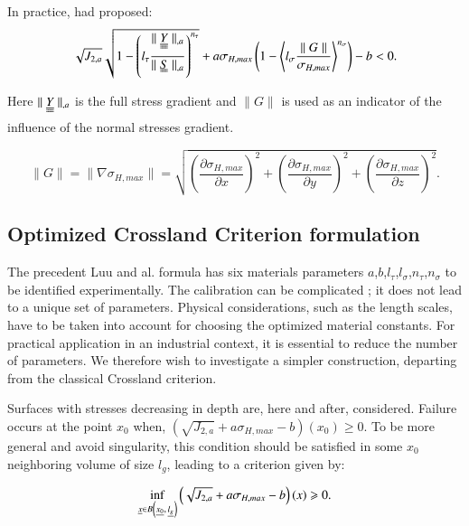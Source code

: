 \documentclass[3p,times,procedia,number]{elsarticle}
\begin{document}
In practice, \cite{luu2013formulation} had proposed:
\begin{equation}
\sqrt{{J_{2,a}}}\sqrt{1-\left(l_\tau\dfrac{\parallel \uuline{\uline{Y}}\parallel_{,a}}{\parallel \uuline{S}\parallel_{,a}}\right)^{n_\tau}}+a\sigma_{H,max}\left(1-\left\langle  l_\sigma\dfrac{\parallel G\parallel}{\sigma_{H,max}}\right\rangle ^{n_\sigma}\right)-b < 0 .
\end{equation}

Here $\parallel \uuline{\uline{Y}}\parallel_{,a}$ is the full stress gradient and $\parallel G\parallel$ is used as an indicator of the influence of the normal stresses gradient.

\begin{equation}
\parallel{G}\parallel=\parallel{\nabla \sigma_{H,max}}\parallel=\sqrt{\left(\dfrac{\partial \sigma_{H,max}}{\partial x}\right)^2+\left(\dfrac{\partial \sigma_{H,max}}{\partial y}\right)^2+\left(\dfrac{\partial \sigma_{H,max}}{\partial z}\right)^2} .
\end{equation}



\subsection{Optimized Crossland Criterion formulation}
The precedent Luu and al. formula has six materials parameters $a$,$b$,$l_\tau$,$l_\sigma$,$n_\tau$,$n_\sigma$ to be identified experimentally. The calibration can be complicated ; it does not lead to a unique set of parameters. Physical considerations, such as the length scales, have to be taken into account for choosing the optimized material constants. For practical application in an industrial context, it is essential to reduce the number of parameters. We therefore wish to investigate a simpler construction, departing from the classical Crossland criterion.

Surfaces with stresses decreasing in depth are, here and after, considered. Failure occurs at the point $x_0$ when,  $(\sqrt{J_{2,a}}+a\sigma_{H,max}-b)(x_0)\geqslant 0 $. To be more general and avoid singularity, this condition should be satisfied in some $x_0$ neighboring volume of size $l_g$, leading to a criterion given by:

\begin{equation}
\inf\limits_{\uline{x}\in B\left( \uline{x_0},\,\uline{l_g}\right) }\left( \sqrt{J_{2,a}}+a\sigma_{H,max}-b\right) (x)\geqslant 0 .
\label{crossland-x0-2}
\end{equation}
\end{document}
